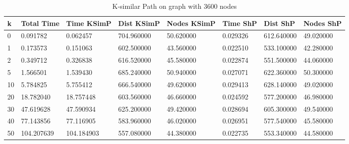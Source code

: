 \documentclass[]{article}
\numberwithin{equation}{section}
\begin{document}
\begin{appendices}
\begin{table}[H]
	\centering
	\small
	\setlength\tabcolsep{2pt}
	\begin{tabular}{|l|l|l|l|l|l|l|l|}
		\hline
		k  & Total Time & Time KSimP & Dist KSimP & Nodes KSimP & Time ShP & Dist ShP   & Nodes ShP \\ \hline
		0  & 0.091782   & 0.062457   & 704.960000 & 50.620000   & 0.029326 & 612.640000 & 49.020000 \\ \hline
		1  & 0.173573   & 0.151063   & 602.500000 & 43.560000   & 0.022510 & 533.100000 & 42.280000 \\ \hline
		2  & 0.349712   & 0.326838   & 616.520000 & 45.580000   & 0.022874 & 551.500000 & 44.060000 \\ \hline
		5  & 1.566501   & 1.539430   & 685.240000 & 50.940000   & 0.027071 & 622.360000 & 50.300000 \\ \hline
		10 & 5.784825   & 5.755412   & 666.540000 & 49.620000   & 0.029413 & 628.140000 & 49.020000 \\ \hline
		20 & 18.782040  & 18.757448  & 603.560000 & 46.660000   & 0.024592 & 577.200000 & 46.980000 \\ \hline
		30 & 47.619628  & 47.590934  & 625.200000 & 49.420000   & 0.028694 & 605.300000 & 49.540000 \\ \hline
		40 & 77.143856  & 77.116905  & 583.960000 & 46.020000   & 0.026951 & 577.540000 & 45.580000 \\ \hline
		50 & 104.207639 & 104.184903 & 557.080000 & 44.380000   & 0.022735 & 553.340000 & 44.580000 \\ \hline
	\end{tabular}
	\caption{K-similar Path on graph with 3600 nodes}
\end{table}


\end{appendices}
\end{document}
